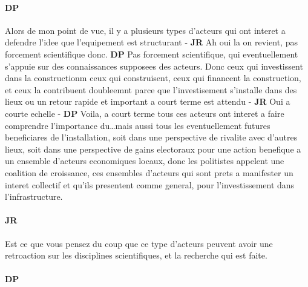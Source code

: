 \documentclass[12pt]{article}
\begin{document}
\paragraph{DP}

Alors de mon point de vue, il y a plusieurs types d'acteurs qui ont interet a defendre l'idee que l'equipement est structurant - \textbf{JR} Ah oui la on revient, pas forcement scientifique donc. \textbf{DP} Pas forcement scientifique, qui eventuellement s'appuie sur des connaissances supposees des acteurs. Donc ceux qui investissent dans la constructionm ceux qui construisent, ceux qui financent la construction, et ceux la contribuent doubleemnt parce que l'investisement s'installe dans des lieux ou un retour rapide et important a court terme est attendu - \textbf{JR} Oui a courte echelle - \textbf{DP} Voila, a court terme tous ces acteurs ont interet a faire comprendre l'importance du\ldots mais aussi tous les eventuellement futures beneficiares de l'installation, soit dans une perspective de rivalite avec d'autres lieux, soit dans une perspective de gains electoraux pour une action benefique a un ensemble d'acteurs economiques locaux, donc les politistes appelent une coalition de croissance, ces ensembles d'acteurs qui sont prets a manifester un interet collectif et qu'ils presentent comme general, pour l'investissement dans l'infrastructure.

\paragraph{JR}

Est ce que vous pensez du coup que ce type d'acteurs peuvent avoir une retroaction sur les disciplines scientifiques, et la recherche qui est faite.

\paragraph{DP}
\end{document}
